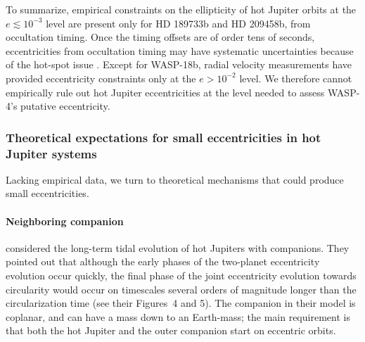 \documentclass[12pt,twocolumn,tighten]{aastex62}
\begin{document}

To summarize, empirical constraints on the ellipticity of hot Jupiter
orbits at the $e \lesssim 10^{-3}$ level are present only for HD
189733b and HD 209458b, from occultation timing.  Once the timing
offsets are of order tens of seconds, eccentricities from occultation
timing may have systematic uncertainties because of the hot-spot issue
\citep{williams_resolving_2006,agol_climate_2010}.  Except for
WASP-18b, radial velocity measurements have provided eccentricity
constraints only at the $e > 10^{-2}$ level.  We therefore cannot
empirically rule out hot Jupiter eccentricities at the level needed to
assess WASP-4's putative eccentricity.

\subsubsection{Theoretical expectations for small eccentricities in hot
Jupiter systems}

Lacking empirical data, we turn to theoretical mechanisms that could
produce small eccentricities.

\paragraph{Neighboring companion}
\citet{mardling_long-term_2007} considered the long-term tidal evolution
of hot Jupiters with companions.  They pointed out that although the
early phases of the two-planet eccentricity evolution occur
quickly, the final phase of the joint eccentricity evolution towards
circularity would occur on timescales several orders of magnitude
longer than the circularization time (see their Figures~4 and 5).  The
companion in their model is coplanar, and can have a mass down to an
Earth-mass; the main requirement is that both the hot Jupiter and the
outer companion start on eccentric orbits.
\end{document}
